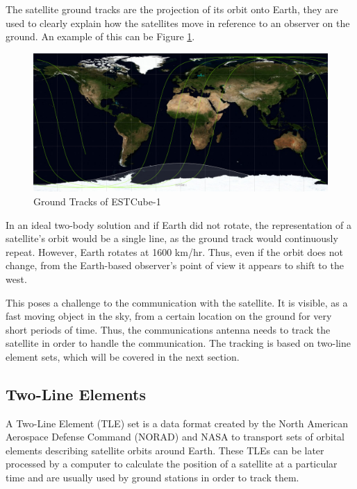 The satellite ground tracks are the projection of its orbit onto Earth, they are used to clearly explain how the satellites move in reference to an observer on the ground. An example of this can be Figure \ref{f2.4}.

\begin{figure}[H]
\centerline{\includegraphics[width=1\textwidth]{images/GroundTracks.png}}
\caption{Ground Tracks of ESTCube-1}
\label{f2.4}
\end{figure}

In an ideal two-body solution and if Earth did not rotate, the representation of a satellite's orbit would be a single line, as the ground track would continuously repeat. However, Earth rotates at 1600 km/hr. Thus, even if the orbit does not change, from the Earth-based observer's point of view it appears to shift to the west.

This poses a challenge to the communication with the satellite. It is visible, as a fast moving object in the sky, from a certain location on the ground for very short periods of time. Thus, the communications antenna needs to track the satellite in order to handle the communication. The tracking is based on two-line element sets, which will be covered in the next section.


\subsection{Two-Line Elements}\label{2.4}
A Two-Line Element (TLE) set is a data format created by the North American Aerospace Defense Command (NORAD) and NASA to transport sets of orbital elements describing satellite orbits around Earth. These TLEs can be later processed by a computer to calculate the position of a satellite at a particular time and are usually used by ground stations in order to track them.


